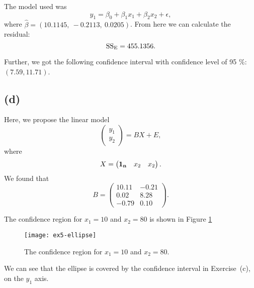 The model used was
\begin{equation*}
  y_1 = \beta_0 + \beta_1 x_1 + \beta_2 x_2 + \epsilon,
\end{equation*}
where $\hat{\beta} = (10.1145,\   -0.2113,\    0.0205)$. From here we
can calculate the residual:
\begin{equation*}
  \text{SS}_{\rm E} = 455.1356.
\end{equation*}

Further, we got the following confidence interval with confidence level of 95
\%: $(7.59, 11.71)$. 

\subsection*{(d)}

Here, we propose the linear model
\begin{equation*}
  \begin{pmatrix}
    y_1 \\ y_2
  \end{pmatrix} = 
  BX + E,
\end{equation*}
where 
\begin{equation*}
  X =
  \begin{pmatrix}
    {\bf 1_n} & x_2 & x_2
  \end{pmatrix}.
\end{equation*}
We found that
\begin{equation*}
  B =
  \begin{pmatrix}
    10.11 & -0.21 \\ 
    0.02 & 8.28 \\ 
    -0.79 & 0.10 
  \end{pmatrix}.
\end{equation*}

The confidence region for $x_1 = 10$ and $x_2 = 80$ is shown in Figure
\ref{fig:ex5-ellipse}
\begin{figure}[h]
  \centering
  \texttt{[image: ex5-ellipse]}
  \caption{The confidence region for $x_1 = 10$ and $x_2 = 80$. }
  \label{fig:ex5-ellipse}
\end{figure}

We can see that the ellipse is covered by 
the confidence interval in Exercise~(c), on the $y_1$ axis.


